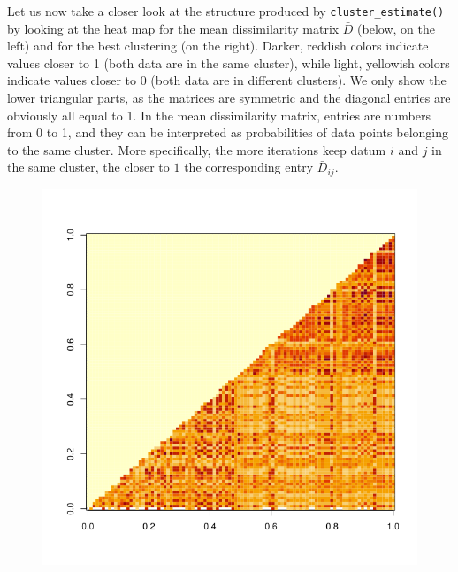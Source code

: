 Let us now take a closer look at the structure produced by \verb|cluster_estimate()| by looking at the heat map for the mean dissimilarity matrix $\bar D$ (below, on the left) and for the best clustering (on the right).
Darker, reddish colors indicate values closer to 1 (both data are in the same cluster), while light, yellowish colors indicate values closer to 0 (both data are in different clusters).
We only show the lower triangular parts, as the matrices are symmetric and the diagonal entries are obviously all equal to 1.
In the mean dissimilarity matrix, entries are numbers from 0 to 1, and they can be interpreted as probabilities of data points belonging to the same cluster.
More specifically, the more iterations keep datum $i$ and $j$ in the same cluster, the closer to $1$ the corresponding entry $\bar D_{ij}$.
\begin{figure}
	\centering
	\begin{minipage}{0.5\textwidth}
		\includegraphics[scale=0.35]{etc/diss_mean.png}
	\end{minipage}%
	\begin{minipage}{0.5\textwidth}

\end{minipage}
\end{figure}
